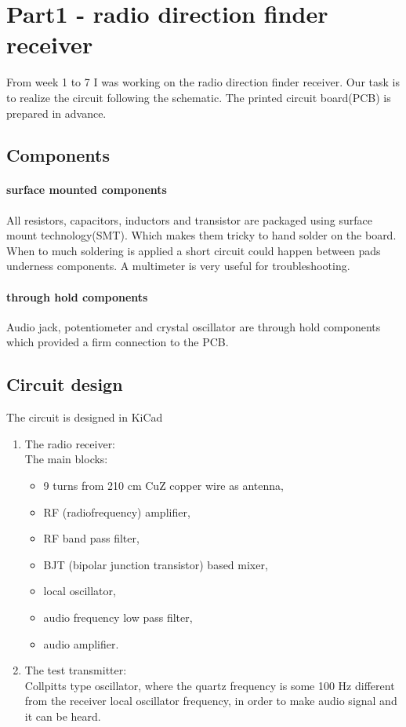 \documentclass[
11pt, %
a4paper, %
oneside, %
headinclude,footinclude, %
BCOR5mm, %
]{scrartcl}
\begin{document}

\newpage %

\section{Part1 - radio direction finder receiver}

From week 1 to 7 I was working on the radio direction finder receiver. Our task is to realize
the circuit following the schematic. The printed circuit board(PCB) is prepared in advance.

\subsection{Components}
\paragraph{surface mounted components}
All resistors, capacitors, inductors and transistor are packaged using surface mount technology(SMT).
Which makes them tricky to hand solder on the board. When to much soldering is applied
a short circuit could happen between pads underness components. A multimeter is very useful
for troubleshooting.

\paragraph{through hold components}
Audio jack, potentiometer and crystal oscillator are through hold components which provided
a firm connection to the PCB.

\subsection{Circuit design}
The circuit is designed in KiCad

\begin{enumerate}
\item
The radio receiver:\\
	The main blocks:
	\begin{itemize}
	\item 9 turns from 210 cm CuZ copper wire as antenna,
	\item RF (radiofrequency) amplifier,
	\item RF band pass filter,
	\item BJT (bipolar junction transistor) based mixer,
	\item local oscillator,
	\item audio frequency low pass filter,
	\item audio amplifier.
	\end{itemize}
\item
The test transmitter:\\
	Collpitts type oscillator, where the quartz frequency is some 100 Hz different from the receiver local oscillator frequency, in order to make audio signal and it can be heard.
\end{enumerate}
\end{document}
